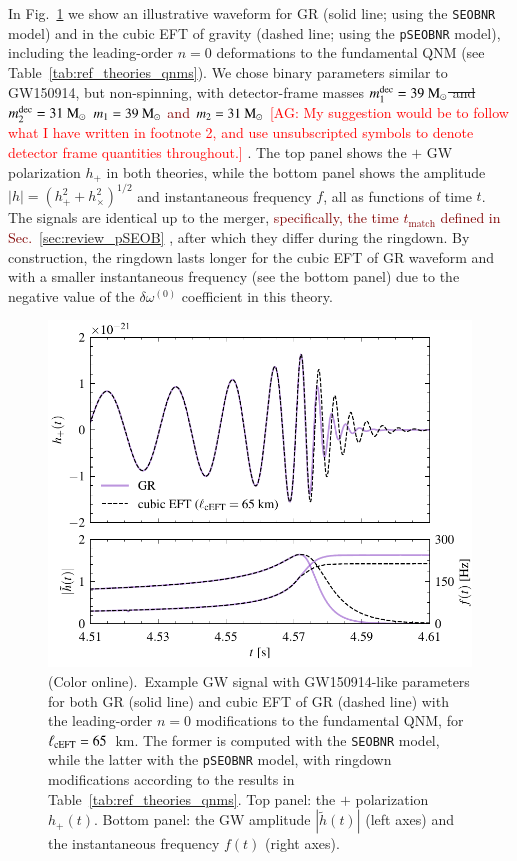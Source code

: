 \documentclass[twocolumn,
               prd,
               aps,
               superscriptaddress,
               tightenlines,
               nofootinbib,
               eqsecnum,
               amsfonts,
               amsmath,
               longbibliography]{revtex4-1}
\newcommand{\pSEOB}{\texttt{pSEOBNR}}
\newcommand{\SEOB}{\texttt{SEOBNR}}
\newcommand{\msun}{~{\rm M}_{\odot}}
\newcommand{\agcomm}[1]{{\textcolor{red}{{[AG: #1]}} }}
\newcommand{\ag}[1]{{\textcolor{Maroon}{{#1}} }}
\begin{document}
In Fig.~\ref{fig:example_waveform} we show an illustrative waveform for GR (solid line; using the \texttt{SEOBNR} model) and in the cubic EFT of gravity (dashed line; using the \pSEOB{} model),
including the leading-order $n = 0$ deformations to the fundamental QNM (see Table~\ref{tab:ref_theories_qnms}).
%
We chose binary parameters similar to GW150914,  but non-spinning, with detector-frame masses
\sout{$m_1^{\rm dec} = 39\msun$ and $m_2^{\rm dec} = 31\msun$}
\ag{$m_1 = 39\msun$ and $m_2 = 31\msun$} \agcomm{My suggestion would be to follow what
I have written in footnote 2, and use unsubscripted symbols to denote detector frame quantities throughout.}.
%
The top panel shows the $+$ GW polarization $h_{+}$ in both theories,
while the bottom panel shows the amplitude $|h| = (h_{+}^2 + h_{\times}^2)^{1/2}$
and instantaneous frequency $f$, all as functions of time $t$.
%
The signals are identical up to the merger,  \ag{specifically, the time $t_\textrm{match}$ 
defined in Sec.~\ref{sec:review_pSEOB}}, after which they differ during the ringdown.
%
By construction, the ringdown lasts longer for the cubic EFT of GR waveform and
with a smaller instantaneous frequency (see the bottom panel) due to the negative value of the
$\delta\omega^{(0)}$ coefficient in this theory.


\begin{figure}[t]
\includegraphics[width=\columnwidth]{figs/example_waveform_cubicEFT.pdf}
\caption{(Color online).~Example GW signal with GW150914-like parameters
for both GR (solid line) and cubic EFT of GR (dashed line) with the leading-order
$n=0$ modifications to the fundamental QNM, for $\ell_{\rm cEFT} = 65$~km.
%
The former is computed with the \SEOB{} model, while the latter with the
\pSEOB{} model, with ringdown modifications according to the results in
Table~\ref{tab:ref_theories_qnms}.
%
Top panel: the $+$ polarization $h_{+}(t)$. Bottom panel: the GW amplitude
$|\tilde{h}(t)|$ (left axes) and the instantaneous frequency $f(t)$ (right axes).
}
\label{fig:example_waveform}
\end{figure}
\end{document}
